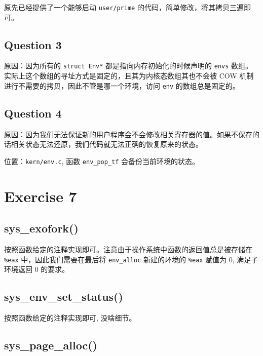\documentclass[11pt]{article}
\begin{document}
	\par 原先已经提供了一个能够启动 \texttt{user/prime} 的代码，简单修改，将其拷贝三遍即可。
	
	\subsection*{Question 3}
	\par 原因：因为所有的 \texttt{struct Env*} 都是指向内存初始化的时候声明的 \texttt{envs} 数组。实际上这个数组的寻址方式是固定的，且其为内核态数组其也不会被 COW 机制进行不需要的拷贝，因此不管是哪一个环境，访问 \texttt{env} 的数组总是固定的。
	
	\subsection*{Question 4}
	\par 原因：因为我们无法保证新的用户程序会不会修改相关寄存器的值。如果不保存的话相关状态无法还原，我们代码就无法正确的恢复原来的状态。
	
	\par 位置：\texttt{kern/env.c}, 函数 \texttt{env\_pop\_tf} 会备份当前环境的状态。
	
	
	\section{Exercise 7}
	
	\subsection*{sys\_exofork()}
		
		\par 按照函数给定的注释实现即可。注意由于操作系统中函数的返回值总是被存储在 \texttt{\%eax} 中，因此我们需要在最后将 \texttt{env\_alloc} 新建的环境的 \texttt{\%eax} 赋值为 0, 满足子环境返回 0 的要求。
		
	\subsection*{sys\_env\_set\_status()}
	
		\par 按照函数给定的注释实现即可, 没啥细节。
		
	
	\subsection*{sys\_page\_alloc()}
	
\end{document}
